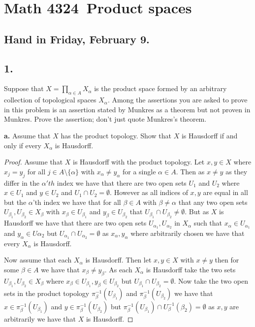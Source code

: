 \documentclass{amsart}
\theoremstyle{plain}
\theoremstyle{definition}
\theoremstyle{remark}
\begin{document}
\section*{Math 4324\  Product spaces } 

\subsection*{Hand in Friday, February 9.} 
\vspace{.15in}


\noindent
\subsection*{1.}  Suppose that  $X = \prod _{\alpha \in A} X_{\alpha}$ is the product space formed by an arbitrary collection of topological spaces $X_{\alpha}$. Among the assertions you are asked to prove in this problem is an assertion stated by Munkres as a theorem but not proven in Munkres. Prove the assertion; don't just quote Munkres's theorem. 

\vspace{.1in}
{\bfseries a.} Assume that $X$ has the product topology. Show that $X$ is Hausdorff if and only if every $X_{\alpha}$ is Hausdorff. 


\begin{proof}
    Assume that $X$ is Hausdorff with the product topology. Let $x,y\in X$ where $x_j=y_j$ for all $j\in A\setminus \{\alpha\}$ with $x_\alpha \not = y_\alpha$ for a single $\alpha \in A$. Then as $x\not = y$ as they differ in the $\alpha'th$ index we have that there are two open sets $U_1$ and $U_2$ where $x\in U_1$ and $y\in U_2$ and $U_1\cap U_2 =\emptyset$. However as all indices of $x,y$ are equal in all but the $\alpha$'th index we have that for all $\beta \in A$ with $\beta\not = \alpha$ that any two open sets $U_{\beta_1},U_{\beta_2}\in X_\beta$ with $x_\beta\in U_{\beta_1}$ and $y_\beta\in U_{\beta_2}$ that $U_{\beta_1}\cap U_{\beta_2}\not = \emptyset$. But as $X$ is Hausdorff we have that there are two open sets $U_{\alpha_1}, U_{\alpha_2}$ in $X_\alpha$ such that $x_\alpha \in U_{\alpha_1}$ and $y_\alpha \in U{\alpha_2}$ but $U_{\alpha_1}\cap U_{\alpha_2}=\emptyset$ as $x_\alpha,y_\alpha$ where arbitrarily chosen we have that every $X_\alpha$ is Hausdorff. 

    Now assume that each $X_\alpha$ is Hausdorff. Then let $x,y\in X$ with $x\not = y$ then for some $\beta\in A$ we have that $x_\beta\not = y_\beta$. As each $X_\alpha$ is Hausdorff take the two sets $U_{\beta_1},U_{\beta_2}\in X_\beta$ where $x_\beta \in U_{\beta_1},y_\beta \in U_{\beta_2}$ but $U_{\beta_1}\cap U_{\beta_2}=\emptyset$. Now take the two open sets in the product topology $\pi_{\beta}^{-1}(U_{\beta_1})$ and $\pi_{\beta}^{-1}(U_{\beta_2})$ we have that $x\in\pi_{\beta}^{-1}(U_{\beta_1}) $ and $y\in\pi_{\beta}^{-1}(U_{\beta_2})$ but $\pi_{\beta}^{-1}(U_{\beta_1})\cap U_\beta^{-1}(\beta_2)=\emptyset$ as $x,y$ are arbitrarily we have that $X$ is Hausdorff.
    

\end{proof}
\end{document}
